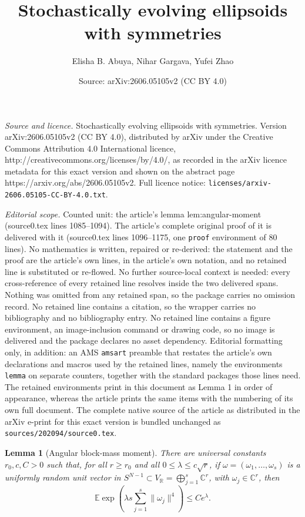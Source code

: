 \documentclass[10pt,a4paper]{amsart}
\title{Stochastically evolving ellipsoids with symmetries}
\author{Elisha B. Abuya, Nihar Gargava, Yufei Zhao}
\date{Source: arXiv:2606.05105v2 (CC BY 4.0)}
\newtheorem{lemma}{Lemma}
\newcommand{\C}{\mathbb C}
\newcommand{\E}{\mathbb E}
\newcommand{\R}{\mathbb R}
\begin{document}
\maketitle

\noindent\emph{Source and licence.} Stochastically evolving ellipsoids with symmetries. Version arXiv:2606.05105v2 (CC BY 4.0), distributed by arXiv under the Creative Commons Attribution 4.0 International licence, http://creativecommons.org/licenses/by/4.0/, as recorded in the arXiv licence metadata for this exact version and shown on the abstract page https://arxiv.org/abs/2606.05105v2. Full licence notice: \texttt{licenses/arxiv-2606.05105-CC-BY-4.0.txt}.\par\smallskip

\noindent\textit{Editorial scope.} Counted unit: the article's lemma lem:angular-moment (source0.tex lines 1085--1094). The article's complete original proof of it is delivered with it (source0.tex lines 1096--1175, one \texttt{proof} environment of 80 lines). No mathematics is written, repaired or re-derived: the statement and the proof are the article's own lines, in the article's own notation, and no retained line is substituted or re-flowed.  No further source-local context is needed: every cross-reference of every retained line resolves inside the two delivered spans.  Nothing was omitted from any retained span, so the package carries no omission record.  No retained line contains a citation, so the wrapper carries no bibliography and no bibliography entry.  No retained line contains a figure environment, an image-inclusion command or drawing code, so no image is delivered and the package declares no asset dependency.  Editorial formatting only, in addition: an AMS \texttt{amsart} preamble that restates the article's own declarations and macros used by the retained lines, namely the environments \texttt{lemma} on separate counters, together with the standard packages those lines need.  The retained environments print in this document as Lemma 1 in order of appearance, whereas the article prints the same items with the numbering of its own full document.  The complete native source of the article as distributed in the arXiv e-print for this exact version is bundled unchanged as \texttt{sources/202094/source0.tex}.
\begin{lemma}[Angular block-mass moment]\label{lem:angular-moment}
There are universal constants $r_0,c,C>0$ such that, for all $r\ge r_0$ and all
$0\le\lambda\le c\sqrt r$, if
$\omega=(\omega_1,\dots,\omega_s)$ is a uniformly random unit vector in
$S^{N-1}\subset V_\R=\bigoplus_{j=1}^s\C^r$, with $\omega_j\in\C^r$, then
\[
        \E\exp\left(\lambda s\sum_{j=1}^s\|\omega_j\|^4\right)
        \le Ce^\lambda.
\]
\end{lemma}
\end{document}
